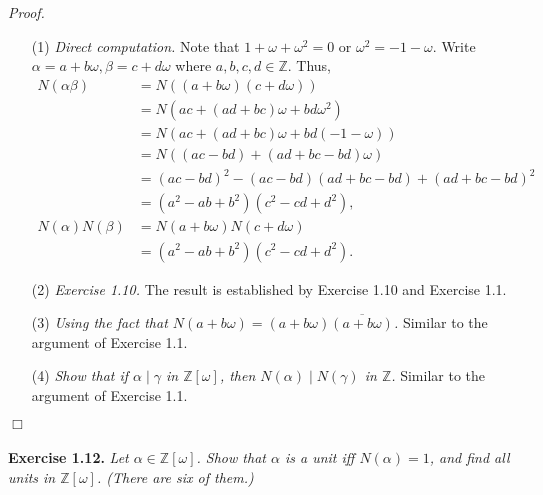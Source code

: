 \documentclass{article}
\begin{document}
\emph{Proof.}
\begin{enumerate}
\item[(1)]
\emph{Direct computation.}
Note that $1+\omega+\omega^2 = 0$ or $\omega^2 = -1-\omega$.
Write $\alpha = a+b\omega, \beta=c+d\omega$ where $a, b, c, d \in \mathbb{Z}$.
Thus,
\begin{align*}
N(\alpha\beta)
&= N((a+b\omega)(c+d\omega)) \\
&= N(ac + (ad+bc)\omega + bd\omega^2) \\
&= N(ac + (ad+bc)\omega + bd(-1-\omega)) \\
&= N((ac-bd) + (ad+bc-bd)\omega) \\
&= (ac-bd)^2 - (ac-bd)(ad+bc-bd) + (ad+bc-bd)^2 \\
&= (a^2 - ab + b^2)(c^2 - cd + d^2), \\
N(\alpha)N(\beta)
&= N(a+b\omega) N(c+d\omega) \\
&= (a^2 - ab + b^2)(c^2 - cd + d^2).
\end{align*}
\item[(2)]
\emph{Exercise 1.10.}
The result is established by Exercise 1.10 and Exercise 1.1.
\item[(3)]
\emph{Using the fact that $N(a+b\omega) = (a+b\omega)\overline{(a+b\omega)}$.}
Similar to the argument of Exercise 1.1.
\item[(4)]
\emph{Show that if $\alpha \mid \gamma$ in $\mathbb{Z}[\omega]$,
then $N(\alpha) \mid N(\gamma)$ in $\mathbb{Z}$.}
Similar to the argument of Exercise 1.1.
\end{enumerate}
$\Box$ \\\\






\textbf{Exercise 1.12.}
\emph{Let $\alpha \in \mathbb{Z}[\omega]$.
Show that $\alpha$ is a unit iff $N(\alpha) = 1$,
and find all units in $\mathbb{Z}[\omega]$.
(There are six of them.)} \\
\end{document}
